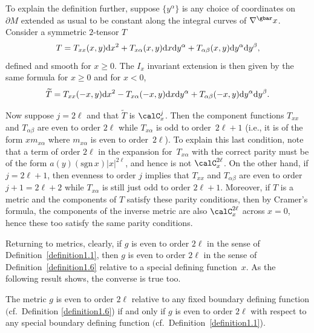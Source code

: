 \noindent To explain the definition further, suppose $\{y^{\alpha}\}$ is any choice of coordinates on $\partial M$ extended as usual to be constant along the integral curves of $\nabla^{\gbar} x$. Consider a symmetric $2$-tensor $T$
\[ T= T_{xx}(x,y) {\rm d}x^2+ T_{x\alpha}(x,y) {\rm d}x {\rm d}y^{\alpha} + T_{\alpha \beta}(x,y) {\rm d}y^{\alpha} {\rm d}y^{\beta}, \]
defined and smooth for $x \geq 0$. The $I_x$ invariant extension is then given by the same formula for $x \geq 0$ and for $x < 0$,
\[ \widetilde{T} = T_{xx}(-x,y) {\rm d}x^2 - T_{x\alpha}(-x,y) {\rm d}x {\rm d}y^{\alpha} + T_{\alpha \beta}(-x,y) {\rm d}y^{\alpha} {\rm d}y^{\beta}. \]

Now suppose $j = 2\ell$ and that $\widetilde{T}$ is $\calC^{j}_x$. Then the component functions $T_{xx}$ and $T_{\alpha \beta}$ are even to order $2\ell$ while $T_{x \alpha}$ is odd to order~$2\ell+1$ (i.e., it is of the form $x m_{x\alpha}$ where $m_{x\alpha}$ is even to order~$2\ell$). To explain this last condition,
note that a term of order $2\ell$ in the expansion for~$T_{x\alpha}$ with the correct parity must be of the form
$a(y) (\mathrm{sgn}\, x) |x|^{2\ell}$, and hence is not $\calC^{2\ell}_x$. On the other hand, if $j = 2\ell+1$, then evenness to
order $j$ implies that $T_{xx}$ and $T_{\alpha \beta}$ are even to order $j+1=2\ell+2$ while $T_{x\alpha}$ is still just
odd to order $2\ell+1$. Moreover, if $T$ is a metric and the components of $T$ satisfy these parity conditions, then by Cramer's formula, the
components of the inverse metric are also $\calC^{2\ell}_x$ across $x=0$, hence these too satisfy the same parity conditions.

Returning to metrics, clearly, if $g$ is even to order $2\ell$ in the sense of Definition~\ref{definition1.1}, then $g$ is even to order $2\ell$ in the sense of Definition~\ref{definition1.6} relative to a special defining function~$x$. As the following result shows, the converse is true too.

\begin{Lemma}\label{lemma1.7} The metric $g$ is even to order $2\ell$ relative to any fixed boundary defining function $($cf.\ Definition {\rm \ref{definition1.6})} if and only if $g$ is even to order $2\ell$ with respect to any special boundary defining function $($cf.\ Definition~{\rm \ref{definition1.1})}.
\end{Lemma}

